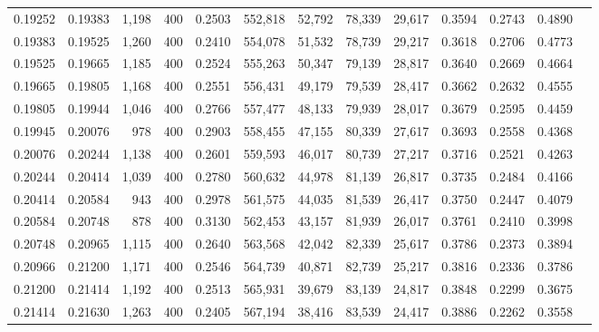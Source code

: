 \begin{tabular}{rrrrrrrrrrrrr}
0.19252 & 0.19383 &  1,198 &   400 &                                     0.2503 & 552,818 &  52,792 &  78,339 &  29,617 & 0.3594 & 0.2743 & 0.4890 \\
0.19383 & 0.19525 &  1,260 &   400 &                                     0.2410 & 554,078 &  51,532 &  78,739 &  29,217 & 0.3618 & 0.2706 & 0.4773 \\
0.19525 & 0.19665 &  1,185 &   400 &                                     0.2524 & 555,263 &  50,347 &  79,139 &  28,817 & 0.3640 & 0.2669 & 0.4664 \\
0.19665 & 0.19805 &  1,168 &   400 &                                     0.2551 & 556,431 &  49,179 &  79,539 &  28,417 & 0.3662 & 0.2632 & 0.4555 \\
0.19805 & 0.19944 &  1,046 &   400 &                                     0.2766 & 557,477 &  48,133 &  79,939 &  28,017 & 0.3679 & 0.2595 & 0.4459 \\
0.19945 & 0.20076 &    978 &   400 &                                     0.2903 & 558,455 &  47,155 &  80,339 &  27,617 & 0.3693 & 0.2558 & 0.4368 \\
0.20076 & 0.20244 &  1,138 &   400 &                                     0.2601 & 559,593 &  46,017 &  80,739 &  27,217 & 0.3716 & 0.2521 & 0.4263 \\
0.20244 & 0.20414 &  1,039 &   400 &                                     0.2780 & 560,632 &  44,978 &  81,139 &  26,817 & 0.3735 & 0.2484 & 0.4166 \\
0.20414 & 0.20584 &    943 &   400 &                                     0.2978 & 561,575 &  44,035 &  81,539 &  26,417 & 0.3750 & 0.2447 & 0.4079 \\
0.20584 & 0.20748 &    878 &   400 &                                     0.3130 & 562,453 &  43,157 &  81,939 &  26,017 & 0.3761 & 0.2410 & 0.3998 \\
0.20748 & 0.20965 &  1,115 &   400 &                                     0.2640 & 563,568 &  42,042 &  82,339 &  25,617 & 0.3786 & 0.2373 & 0.3894 \\
0.20966 & 0.21200 &  1,171 &   400 &                                     0.2546 & 564,739 &  40,871 &  82,739 &  25,217 & 0.3816 & 0.2336 & 0.3786 \\
0.21200 & 0.21414 &  1,192 &   400 &                                     0.2513 & 565,931 &  39,679 &  83,139 &  24,817 & 0.3848 & 0.2299 & 0.3675 \\
0.21414 & 0.21630 &  1,263 &   400 &                                     0.2405 & 567,194 &  38,416 &  83,539 &  24,417 & 0.3886 & 0.2262 & 0.3558 \\

\end{tabular}
